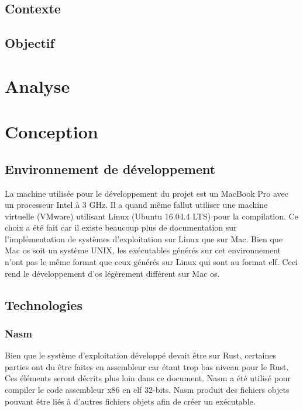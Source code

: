 \documentclass[a4paper]{article}
\begin{document}
\subsection{Contexte}


\subsection{Objectif}

\newpage

\section{Analyse}

\newpage

\section{Conception}
\subsection{Environnement de développement}
La machine utilisée pour le développement du projet est un MacBook Pro avec un
processeur Intel à 3 GHz. Il a quand même fallut utiliser une machine virtuelle
(VMware) utilisant Linux (Ubuntu 16.04.4 LTS) pour la compilation. Ce choix a été
fait car il existe beaucoup plus de documentation sur l'implémentation de systèmes
d'exploitation sur Linux que sur Mac. Bien que Mac \acrshort{os} soit un système UNIX, les
exécutables générés sur cet environnement n'ont pas le même format que ceux générés
sur Linux qui sont au format \acrshort{elf}. Ceci rend le développement d'\acrshort{os} légèrement
différent sur Mac \acrshort{os}.


\subsection{Technologies}
\subsubsection{Nasm}
Bien que le système d'exploitation développé devait être sur Rust, certaines parties
ont du être faites en assembleur car étant trop bas niveau pour le Rust. Ces éléments
seront décrits plus loin dans ce document. Nasm a été  utilisé pour compiler le
code assembleur x86 en \acrshort{elf} 32-bits. Nasm produit des fichiers objets pouvant être
liés à d'autres fichiers objets afin de créer un exécutable. \\
\end{document}

